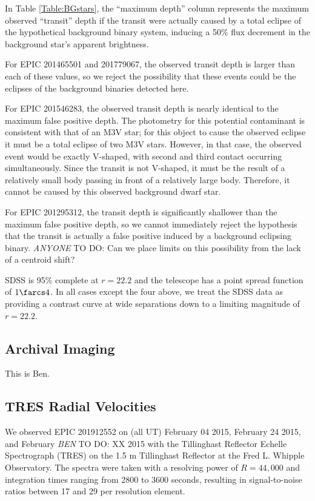 \documentclass{emulateapj}
\newcommand{\todo}[3]{{\color{#2} \emph{#1} TO DO: #3}}
\newcommand{\btmtodo}[1]{\todo{BEN}{red}{#1}}
\newcommand{\anytodo}[1]{\todo{ANYONE}{NavyBlue}{#1}}
\begin{document}
In Table \ref{Table:BGstars}, the ``maximum depth'' column represents
the maximum observed ``transit'' depth if the transit were actually caused
by a total eclipse of the hypothetical background binary system, inducing
a 50\% flux decrement in the background star's apparent brightness.

For EPIC 201465501 and 201779067, the observed transit depth is 
larger than each of these values, so we reject the possibility that
these events could be the eclipses of the background binaries detected
here. 

For EPIC 201546283, the observed transit depth is nearly identical to 
the maximum false positive depth. 
The photometry for this potential contaminant is consistent with that
of an M3V star; for this object to cause the observed eclipse it must
be a total eclipse of two M3V stars. 
However, in that case, the observed event would be exactly V-shaped,
with second and third contact occurring simultaneously. 
Since the transit is not V-shaped, it must be the result of
a relatively small body passing in front of a relatively large body. 
Therefore, it cannot be caused by this observed background dwarf star.

For EPIC 201295312, the transit depth is significantly shallower than
the maximum false positive depth, so we cannot immediately
reject the hypothesis that the transit is actually a false positive 
induced by a background eclipsing binary. \anytodo{Can we place limits
on this possibility from the lack of a centroid shift?}

SDSS is 95\% complete at $r=22.2$ and the telescope has a point
spread function of $1\farcs4$. In all cases except the four above, we 
treat the SDSS data as providing a contrast curve at wide separations
down to a limiting magnitude of $r=22.2$.

\subsection{Archival Imaging}

This is Ben.


\subsection{TRES Radial Velocities}

We observed EPIC 201912552 on (all UT) February 04 2015, February 24 2015,
and February \btmtodo{XX} 2015 with the Tillinghast Reflector Echelle
Spectrograph (TRES) on the 1.5 m Tillinghast Reflector at the Fred L.
Whipple Observatory. 
The spectra were taken with a resolving power of $R=44,000$ and 
integration times ranging from 2800 to 3600 seconds, resulting in 
signal-to-noise ratios between 17 and 29 per resolution element.
\end{document}
